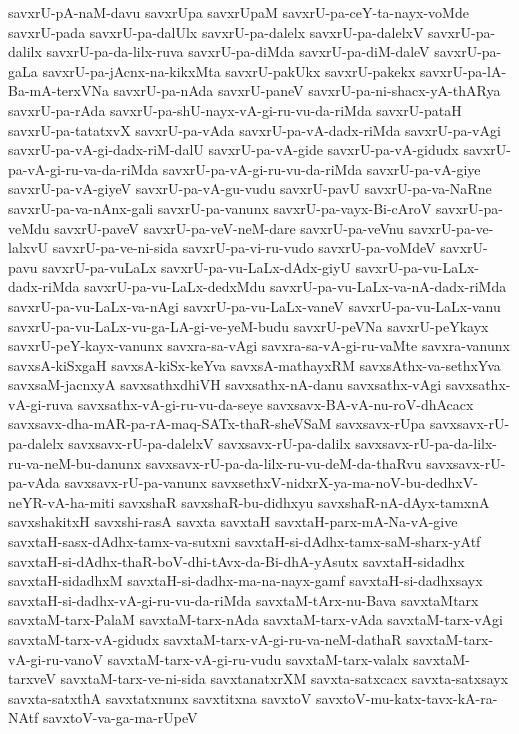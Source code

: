 {savxrU-pA-naM-davu
savxrUpa
savxrUpaM
savxrU-pa-ceY-ta-nayx-voMde
savxrU-pada
savxrU-pa-dalUlx
savxrU-pa-dalelx
savxrU-pa-dalelxV
savxrU-pa-dalilx
savxrU-pa-da-lilx-ruva
savxrU-pa-diMda
savxrU-pa-diM-daleV
savxrU-pa-gaLa
savxrU-pa-jAcnx-na-kikxMta
savxrU-pakUkx
savxrU-pakekx
savxrU-pa-lA-Ba-mA-terxVNa
savxrU-pa-nAda
savxrU-paneV
savxrU-pa-ni-shacx-yA-thARya
savxrU-pa-rAda
savxrU-pa-shU-nayx-vA-gi-ru-vu-da-riMda
savxrU-pataH
savxrU-pa-tatatxvX
savxrU-pa-vAda
savxrU-pa-vA-dadx-riMda
savxrU-pa-vAgi
savxrU-pa-vA-gi-dadx-riM-dalU
savxrU-pa-vA-gide
savxrU-pa-vA-gidudx
savxrU-pa-vA-gi-ru-va-da-riMda
savxrU-pa-vA-gi-ru-vu-da-riMda
savxrU-pa-vA-giye
savxrU-pa-vA-giyeV
savxrU-pa-vA-gu-vudu
savxrU-pavU
savxrU-pa-va-NaRne
savxrU-pa-va-nAnx-gali
savxrU-pa-vanunx
savxrU-pa-vayx-Bi-cAroV
savxrU-pa-veMdu
savxrU-paveV
savxrU-pa-veV-neM-dare
savxrU-pa-veVnu
savxrU-pa-ve-lalxvU
savxrU-pa-ve-ni-sida
savxrU-pa-vi-ru-vudo
savxrU-pa-voMdeV
savxrU-pavu
savxrU-pa-vuLaLx
savxrU-pa-vu-LaLx-dAdx-giyU
savxrU-pa-vu-LaLx-dadx-riMda
savxrU-pa-vu-LaLx-dedxMdu
savxrU-pa-vu-LaLx-va-nA-dadx-riMda
savxrU-pa-vu-LaLx-va-nAgi
savxrU-pa-vu-LaLx-vaneV
savxrU-pa-vu-LaLx-vanu
savxrU-pa-vu-LaLx-vu-ga-LA-gi-ve-yeM-budu
savxrU-peVNa
savxrU-peYkayx
savxrU-peY-kayx-vanunx
savxra-sa-vAgi
savxra-sa-vA-gi-ru-vaMte
savxra-vanunx
savxsA-kiSxgaH
savxsA-kiSx-keYva
savxsA-mathayxRM
savxsAthx-va-sethxYva
savxsaM-jacnxyA
savxsathxdhiVH
savxsathx-nA-danu
savxsathx-vAgi
savxsathx-vA-gi-ruva
savxsathx-vA-gi-ru-vu-da-seye
savxsavx-BA-vA-nu-roV-dhAcacx
savxsavx-dha-mAR-pa-rA-maq-SATx-thaR-sheVSaM
savxsavx-rUpa
savxsavx-rU-pa-dalelx
savxsavx-rU-pa-dalelxV
savxsavx-rU-pa-dalilx
savxsavx-rU-pa-da-lilx-ru-va-neM-bu-danunx
savxsavx-rU-pa-da-lilx-ru-vu-deM-da-thaRvu
savxsavx-rU-pa-vAda
savxsavx-rU-pa-vanunx
savxsethxV-nidxrX-ya-ma-noV-bu-dedhxV-neYR-vA-ha-miti
savxshaR
savxshaR-bu-didhxyu
savxshaR-nA-dAyx-tamxnA
savxshakitxH
savxshi-rasA
savxta
savxtaH
savxtaH-parx-mA-Na-vA-give
savxtaH-sasx-dAdhx-tamx-va-sutxni
savxtaH-si-dAdhx-tamx-saM-sharx-yAtf
savxtaH-si-dAdhx-thaR-boV-dhi-tAvx-da-Bi-dhA-yAsutx
savxtaH-sidadhx
savxtaH-sidadhxM
savxtaH-si-dadhx-ma-na-nayx-gamf
savxtaH-si-dadhxsayx
savxtaH-si-dadhx-vA-gi-ru-vu-da-riMda
savxtaM-tArx-nu-Bava
savxtaMtarx
savxtaM-tarx-PalaM
savxtaM-tarx-nAda
savxtaM-tarx-vAda
savxtaM-tarx-vAgi
savxtaM-tarx-vA-gidudx
savxtaM-tarx-vA-gi-ru-va-neM-dathaR
savxtaM-tarx-vA-gi-ru-vanoV
savxtaM-tarx-vA-gi-ru-vudu
savxtaM-tarx-valalx
savxtaM-tarxveV
savxtaM-tarx-ve-ni-sida
savxtanatxrXM
savxta-satxcacx
savxta-satxsayx
savxta-satxthA
savxtatxnunx
savxtitxna
savxtoV
savxtoV-mu-katx-tavx-kA-ra-NAtf
savxtoV-va-ga-ma-rUpeV
}
